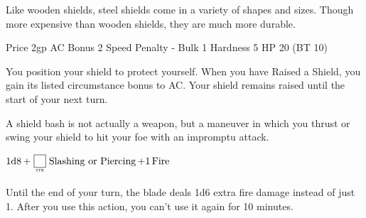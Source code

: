 \documentclass[paper=63mm:88mm, DIV=21, fontsize=7.5pt]{scrartcl}
\begin{document}
Like wooden shields, steel shields come in a variety of shapes and sizes. Though more expensive than wooden shields, they are much more durable.

Price 2gp
AC Bonus 2
Speed Penalty -
Bulk 1
Hardness 5
HP 20 (BT 10)



You position your shield to protect yourself. When you have Raised a Shield, you gain its listed circumstance bonus to AC. Your shield remains raised until the start of your next turn.



A shield bash is not actually a weapon, but a maneuver in which you thrust or swing your shield to hit your foe with an impromptu attack.





\(\operatorname{1d8} + \FormulaVariable{str}{\phantom{1}} \DamageType{Slashing or Piercing} + 1 \DamageType{Fire}\)



Until the end of your turn, the blade deals 1d6 extra fire damage instead of just 1. After you use this action, you can't use it again for 10 minutes.

\vfill

\end{document}

